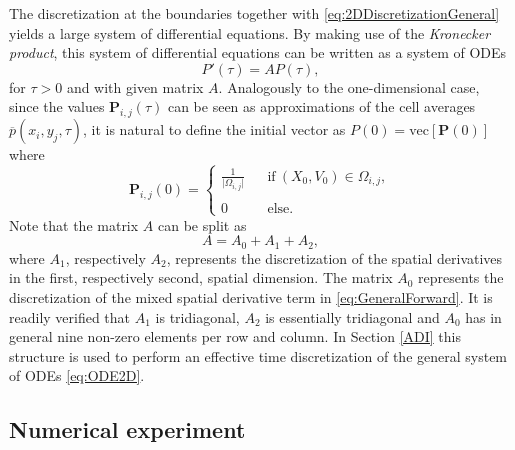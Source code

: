 \documentclass[10pt]{article}
\begin{document}
The discretization at the boundaries together with \eqref{eq:2DDiscretizationGeneral} yields a large system of differential equations. By making use of the \textit{Kronecker product}, this system of differential equations can be written as a system of ODEs
\begin{equation}
P'(\tau) = A P(\tau),
\label{eq:ODE2D}
\end{equation} 
for $\tau > 0$ and with given matrix $A$. 
Analogously to the one-dimensional case, since the values $\boldsymbol{P}_{i,j}(\tau)$ can be seen as approximations of the cell averages $\overline{p}(x_{i},y_{j},\tau)$, it is natural to define the initial vector as $P(0) = \mathrm{vec}[\boldsymbol{P}(0)]$ where
$$ \boldsymbol{P}_{i,j}(0) = \left\{ \begin{array}{lll}
\tfrac{1}{\vert \Omega_{i,j} \vert} & & \mathrm{if} \ (X_{0},V_{0}) \in \Omega_{i,j}, \\ \\
0 & & \mathrm{else.}
\end{array} \right. $$
Note that the matrix $A$ can be split as
$$ A = A_{0} + A_{1} + A_{2},$$
where $A_{1}$, respectively $A_{2}$, represents the discretization of the spatial derivatives in the first, respectively second, spatial dimension. The matrix $A_{0}$ represents the discretization of the mixed spatial derivative term in \eqref{eq:GeneralForward}. It is readily verified that $A_{1}$ is tridiagonal, $A_{2}$ is essentially tridiagonal and $A_{0}$ has in general nine non-zero elements per row and column. 
In Section \ref{ADI} this structure is used to perform an effective time discretization of the general system of ODEs \eqref{eq:ODE2D}.




\subsection{Numerical experiment}
\end{document}
